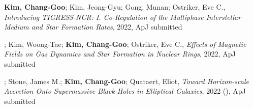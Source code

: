 \item \textbf{Kim, Chang-Goo}; Kim, Jeong-Gyu; Gong, Munan;  Ostriker, Eve C., \textit{Introducing TIGRESS-NCR: I. Co-Regulation of the Multiphase Interstellar Medium and Star Formation Rates}, 2022, ApJ submitted
\item {}; Kim, Woong-Tae; \textbf{Kim, Chang-Goo}; Ostriker, Eve C., \textit{Effects of Magnetic Fields on Gas Dynamics and Star Formation in Nuclear Rings}, 2022, ApJ submitted
\item {}; Stone, James M.; \textbf{Kim, Chang-Goo}; Quataert, Eliot, \textit{Toward Horizon-scale Accretion Onto Supermassive Black Holes in Elliptical Galaxies}, 2022 (), ApJ submitted
